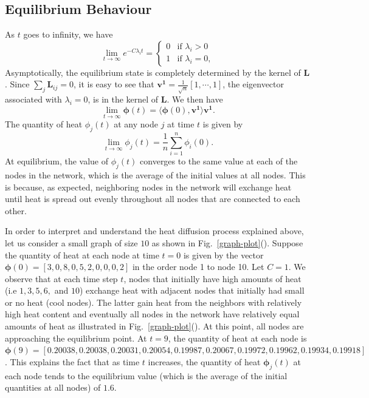 \documentclass[10pt,a4paper]{article}
\begin{document}
\subsection{Equilibrium Behaviour} 
As $t$ goes to infinity, we have 
\begin{equation}
\lim_{t \to \infty} e^{-C\lambda_i t} = \begin{cases} 0 &\mbox{if } \lambda_i > 0 \\
1 & \mbox{if } \lambda_i = 0, \end{cases} 
\end{equation}
Asymptotically, the equilibrium state is completely determined by the kernel of $\mathbf{L}$. Since $\sum_{j} \mathbf{L}_{ij}=0$, it is easy to see that $\mathbf{v^1}= \frac{1}{\sqrt{n}}[1,\cdots,1]$, the eigenvector associated with $\lambda_i =0$, is in the kernel of $\mathbf{L}$. We then have
\begin{equation}
\lim_{t \to \infty}\boldsymbol{\phi}(t) = \langle \boldsymbol{\phi}(0), \mathbf{v^1} \rangle \mathbf{v^1}.
\end{equation}
The quantity of heat $\phi_j(t)$ at any node $j$ at time $t$ is given by
\begin{equation}
\lim_{t \to \infty}\phi_j(t) = \frac{1}{n} \sum_{i = 1}^n \phi_i(0). 
\end{equation}
At equilibrium, the value of $\phi_{j}(t)$ converges to the same value at each of the nodes in the network, which is the average of the initial values at all nodes. This is because, as expected, neighboring nodes in the network will exchange heat until heat is spread out evenly throughout all nodes that are connected to each other.

In order to interpret and understand the heat diffusion process explained above, let us consider a small graph of size $10$ as shown in Fig.~\ref{graph-plot}(). Suppose the quantity of heat at each node at time $t=0$ is given by the vector $\boldsymbol{\phi}(0)= [3,0,8,0,5,2,0,0,0,2]$ in the order node 1 to node 10. Let $C=1$. We observe that at each time step $t$, nodes that initially have high amounts of heat (i.e $1,3,5,6,$ and $10$) exchange heat with adjacent nodes that initially had small or no heat (cool nodes). The latter gain heat from the neighbors with relatively high heat content and eventually all nodes in the network have relatively equal amounts of heat as illustrated in Fig.~\ref{graph-plot}(). At this point, all nodes are approaching the equilibrium point. At $t=9$, the quantity of heat at each node is $\boldsymbol{\phi}(9)=[0.20038,  0.20038,  0.20031,  0.20054,  0.19987,0.20067 ,  0.19972,  0.19962,  0.19934,  0.19918]$. 
This explains the fact that as time $t$ increases, the quantity of heat $\boldsymbol{\phi}_j(t)$ at each node tends to the equilibrium value (which is the average of the initial quantities at all nodes) of $1.6$. 
	
\end{document}
